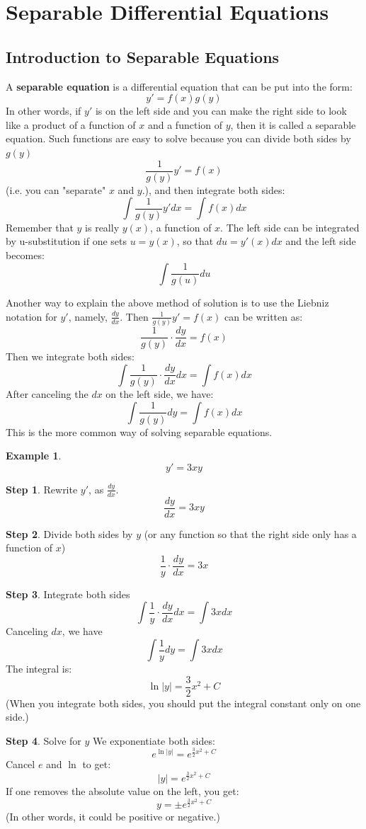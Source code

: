 \documentclass[12pt]{report}
\newtheorem{ex}{Example}[section]
\begin{document}
\section{Separable Differential Equations}
\subsection*{Introduction to Separable Equations}
A \textbf{separable equation} is a differential equation that can be put into the form:
$$y'=f(x)g(y)$$
In other words, if $y'$ is on the left side and you can make the right side to look like a product of a function of $x$ and a function of $y$, then it is called a separable equation.
Such functions are easy to solve because you can divide both sides by $g(y)$
$$\frac{1}{g(y)} y' = f(x) $$
(i.e. you can "separate" $x$ and $y$.), and then integrate both sides:
$$\int \frac{1}{g(y)} y' dx = \int f(x) dx$$
Remember that $y$ is really $y(x)$, a function of $x$. The left side can be integrated by u-substitution if one sets $u=y(x)$, so that $du=y'(x)dx$ and the left side becomes:
$$\int \frac{1}{g(u)} du$$

Another way to explain the above method of solution is to use the Liebniz notation for $y'$, namely, $\frac{dy}{dx}$. Then $\frac{1}{g(y)} y' = f(x) $ can be written as:
$$\frac{1}{g(y)} \cdot \frac{dy}{dx} = f(x)$$
Then we integrate both sides:
$$\int \frac{1}{g(y)} \cdot \frac{dy}{dx} dx = \int f(x) dx$$
After canceling the $dx$ on the left side, we have:
$$\int \frac{1}{g(y)} dy = \int f(x) dx$$
This is the more common way of solving separable equations.

\begin{ex}
	$$y'=3xy$$
\end{ex}

\textbf{Step 1}. Rewrite $y'$, as $\frac{dy}{dx}$.
$$\frac{dy}{dx}=3xy$$

\textbf{Step 2}. Divide both sides by $y$ (or any function so that the right side only has a function of $x$)
$$ \frac{1}{y} \cdot \frac{dy}{dx} = 3x $$

\textbf{Step 3}. Integrate both sides
$$\int \frac{1}{y} \cdot \frac{dy}{dx} dx=\int 3x dx$$
Canceling $dx$, we have
$$\int \frac{1}{y} dy=\int 3x dx$$
The integral is:
$$ \ln |y| = \frac{3}{2} x^2 + C$$
(When you integrate both sides, you should put the integral constant only on one side.)

\textbf{Step 4}. Solve for $y$
We exponentiate both sides:
$$ e^{\ln |y|} = e^{\frac{3}{2} x^2 + C} $$
Cancel $e$ and $\ln$ to get:
$$|y| = e^{\frac{3}{2} x^2 + C}$$
If one removes the absolute value on the left, you get:
$$ y = \pm e^{\frac{3}{2} x^2 + C}$$
(In other words, it could be positive or negative.)
\end{document}
